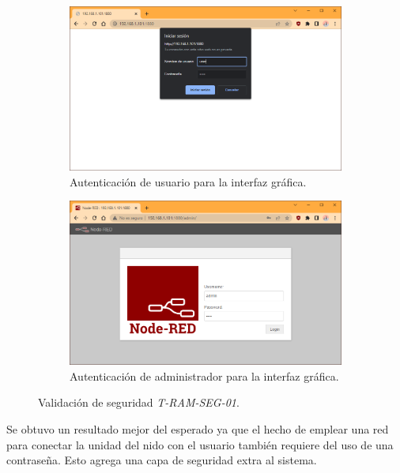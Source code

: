 \begin{figure}[H]
\centering
    	\begin{subfigure}{0.49\textwidth}
        	\centering
        	\includegraphics[width=\linewidth]{ImagenesValidacion del prototipo/t-ram-seg-01-1}		
			\caption{Autenticación de usuario para la interfaz gráfica.}
        \end{subfigure}\hfill
        \begin{subfigure}{0.49\textwidth}
        	\centering
        	\includegraphics[width=\linewidth]{ImagenesValidacion del prototipo/t-ram-seg-01-2}
        	\caption{Autenticación de administrador para la interfaz gráfica.}
        \end{subfigure}
	\caption{Validación de seguridad \textit{T-RAM-SEG-01}.}
\end{figure}

Se obtuvo un resultado mejor del esperado ya que el hecho de emplear una red \wifi para conectar la unidad del nido con el usuario también requiere del uso de una contraseña. Esto agrega una capa de seguridad extra al sistema.


%



